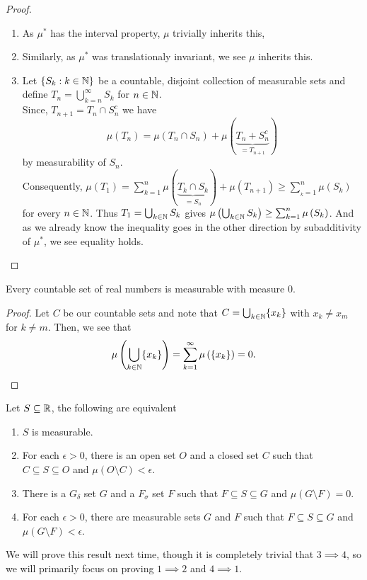 \begin{proof}
	\begin{enumerate}
		\item As \( \mu^{*}\) has the interval property, \( \mu\) trivially inherits this,
			\item Similarly, as \( \mu^{*}\) was translationaly invariant, we see \( \mu\) inherits this.
				\item Let \(\{S_{k} : k \in \mathbb{N}\} \) be a countable, disjoint collection of measurable sets and define \(T_{n} = \bigcup_{k = n} ^{\infty}S_{k}\) for \(n \in \mathbb{N}\).\\
					Since, \(T_{n  + 1} = T_{n} \cap S_{n}^{c}\) we have \[
					\mu \left( T_{n} \right) = \mu \left( T_{n} \cap S_{n} \right) + \mu \left( \underbrace{T_{n} + S_{n}^{c}}_{= T_{n + 1}}	 \right)
				\] by measurability of \(S_{n}\). \\
				Consequently, \( \mu \left( T_1 \right) = \sum_{k=1}^{n} \mu \left( \underbrace{T_{k} \cap S_{k}}_{= S_{n}} \right) + \mu \left( T_{n + 1} \right) \ge \sum_{_{k}=1}^{n} \mu \left( S_{k} \right)  \) for every \( n \in \mathbb{N}\).
				Thus \(T_1 = \bigcup_{k \in \mathbb{N}} S_{k}\) gives \( \mu\left( \bigcup_{k \in \mathbb{N}} S_{k} \right)  \ge \sum_{k= 1}^{n} \mu\left( S_{k} \right) \). And as we already know the inequality goes in the other direction by subadditivity of \( \mu^{*}\), we see equality holds.
	\end{enumerate}
\end{proof}
\begin{corollary}
	Every countable set of real numbers is measurable with measure \(0\).
\end{corollary}
\begin{proof}
	Let \(C\) be our countable sets and note that \(C = \bigcup_{k \in \mathbb{N}} \{x_{k}\} \) with \(x_{k} \neq x_{m}\) for \(k \neq m\). Then, we see that \[
		\mu \left( \bigcup_{k \in \mathbb{N}} \{x_{k}\}  \right)  = \sum_{k=1}^{\infty} \mu \left( \{x_{k}\}  \right)  = 0
	.\]
\end{proof}
\begin{theorem}
	Let \(S \subseteq \mathbb{R}\), the following are equivalent
	\begin{enumerate}
		\item \(S\) is measurable.
		\item For each \(\epsilon > 0\), there is an open set \(O\) and a closed set \(C\) such that \(C \subseteq S \subseteq O\) and \( \mu \left( O \setminus C \right)  < \epsilon\).
		\item There is a \(G_{\delta}\) set \(G\) and a \(F_{\sigma}\) set \(F\) such that \(F \subseteq S \subseteq G\) and \( \mu \left( G \setminus F \right)  = 0\).
		\item For each \(\epsilon > 0\), there are measurable sets \(G\) and \(F\) such that \(F \subseteq S \subseteq G\) and \( \mu \left( G \setminus F \right) < \epsilon\).
	\end{enumerate}
	We will prove this result next time, though it is completely trivial that \(3 \implies 4\), so we will primarily focus on proving \(1 \implies 2\) and \(4 \implies 1\).
\end{theorem}
